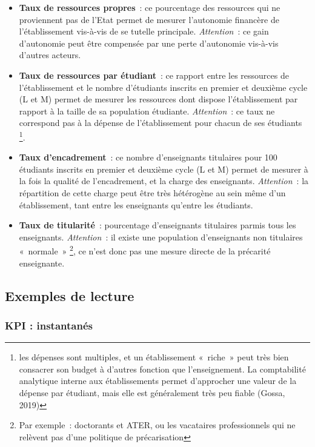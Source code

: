 \documentclass[12pt,french,landscape]{article}
\providecommand{\tightlist}{%
  \setlength{\itemsep}{0pt}\setlength{\parskip}{0pt}}
\begin{document}
\begin{multicols}{2}
\begin{itemize}
\tightlist
\item
  \textbf{Taux de ressources propres}~: ce pourcentage des ressources
  qui ne proviennent pas de l'Etat permet de mesurer l'autonomie
  financère de l'établissement vis-à-vis de se tutelle principale.
  \emph{Attention}~: ce gain d'autonomie peut être compensée par une
  perte d'autonomie vis-à-vis d'autres acteurs.
\item
  \textbf{Taux de ressources par étudiant}~: ce rapport entre les
  ressources de l'établissement et le nombre d'étudiants inscrits en
  premier et deuxième cycle (L et M) permet de mesurer les ressources
  dont dispose l'établissement par rapport à la taille de sa population
  étudiante. \emph{Attention}~: ce taux ne correspond pas à la dépense
  de l'établissement pour chacun de ses étudiants \footnote{les dépenses
    sont multiples, et un établissement «~riche~» peut très bien
    consacrer son budget à d'autres fonction que l'enseignement. La
    comptabilité analytique interne aux établissements permet
    d'approcher une valeur de la dépense par étudiant, mais elle est
    généralement très peu fiable (Gossa, 2019)}.
\item
  \textbf{Taux d'encadrement}~: ce nombre d'enseignants titulaires pour
  100 étudiants inscrits en premier et deuxième cycle (L et M) permet de
  mesurer à la fois la qualité de l'encadrement, et la charge des
  enseignants. \emph{Attention}~: la répartition de cette charge peut
  être très hétérogène au sein même d'un établissement, tant entre les
  enseignants qu'entre les étudiants.
\item
  \textbf{Taux de titularité}~: pourcentage d'enseignants titulaires
  parmis tous les enseignants. \emph{Attention}~: il existe une
  population d'enseignants non titulaires «~normale~» \footnote{Par
    exemple~: doctorants et ATER, ou les vacataires professionnels qui
    ne relèvent pas d'une politique de précarisation}, ce n'est donc pas
  une mesure directe de la précarité enseignante.
\end{itemize}

\hypertarget{exemples-de-lecture}{%
\subsection{Exemples de lecture}\label{exemples-de-lecture}}

\hypertarget{kpi-instantanuxe9s}{%
\subsubsection{KPI : instantanés}\label{kpi-instantanuxe9s}}


\end{multicols}
\end{document}
